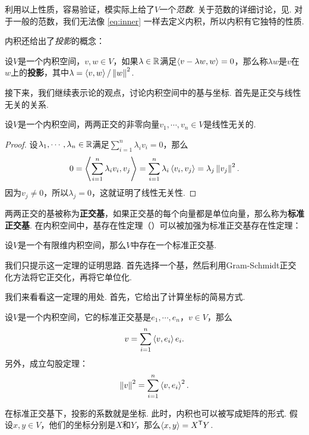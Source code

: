 利用以上性质，容易验证，模实际上给了$V$一个\emph{范数}. 关于范数的详细讨论，见. 对于一般的范数，我们无法像 \eqref{eq:inner} 一样去定义内积，所以内积有它独特的性质. 

内积还给出了\emph{投影}的概念：

\begin{definition}[投影]
设$V$是一个内积空间，$v,w\in V$，如果$\lambda\in\mathbb{R}$满足$\left\langle{v-\lambda w},{w}\right\rangle=0$，那么称$\lambda w$是$v$在$w$上的\textbf{投影}，其中$\lambda=\left\langle{v},{w}\right\rangle/\left\|w\right\|^2$.
\end{definition}

接下来，我们继续表示论的观点，讨论内积空间中的基与坐标. 首先是正交与线性无关的关系. 

\begin{proposition}\label{prop:orthogonal}
设$V$是一个内积空间，两两正交的非零向量$v_1,\cdots,v_n\in V$是线性无关的. 
\end{proposition}
\begin{proof}
设$\lambda_1,\cdots,\lambda_n\in\mathbb{R}$满足$\sum_{i=1}^n\lambda_iv_i=0$，那么
\[
    0=\left\langle{\sum_{i=1}^n\lambda_iv_i},{v_j}\right\rangle=\sum_{i=1}^n\lambda_i\left\langle{v_i},{v_j}\right\rangle=\lambda_j\left\|v_j\right\|^2.
\]
因为$v_j\neq 0$，所以$\lambda_j=0$，这就证明了线性无关性. 
\end{proof}

两两正交的基被称为\textbf{正交基}，如果正交基的每个向量都是单位向量，那么称为\textbf{标准正交基}. 在内积空间中，基存在性定理（）可以被加强为标准正交基存在性定理：

\begin{theorem}[标准正交基存在性定理]\label{thm:orthogonal-basis}
设$V$是一个有限维内积空间，那么$V$中存在一个标准正交基. 
\end{theorem}

我们只提示这一定理的证明思路. 首先选择一个基，然后利用Gram-Schmidt正交化方法将它正交化，再将它单位化. 

我们来看看这一定理的用处. 首先，它给出了计算坐标的简易方式. 

\begin{proposition}\label{prop:projection}
设$V$是一个内积空间，它的标准正交基是$e_1,\cdots,e_n$，$v\in V$，那么
\[
    v=\sum_{i=1}^n\left\langle{v},{e_i}\right\rangle e_i.
\]
另外，成立勾股定理：
\[
    \left\|v\right\|^2=\sum_{i=1}^n\left\langle{v},{e_i}\right\rangle^2.
\]
\end{proposition}

在标准正交基下，投影的系数就是坐标. 此时，内积也可以被写成矩阵的形式. 假设$x,y\in V$，他们的坐标分别是$X$和$Y$，那么$\left\langle{x},{y}\right\rangle=X^{\mathsf{T}} Y$.

